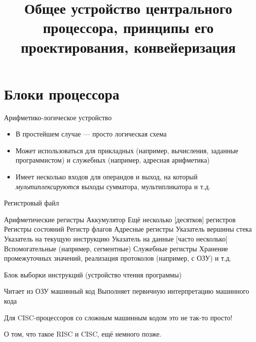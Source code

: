 \documentclass[xetex,aspectratio=43]{beamer}
\title[Устройство и принципы проектирования ЦП, конвейеризация]{Общее устройство центрального процессора, принципы его проектирования, конвейеризация}
\begin{document}
    \titleslide

    \tocslide

\section{Блоки процессора}

\begin{frame}{Арифметико-логическое устройство}
    \begin{itemize}
        \item В простейшем случае --- просто логическая схема
        \item Может использоваться для прикладных (например, вычисления, заданные программистом) и служебных (например, адресная арифметика)
        \item Имеет несколько входов для операндов и выход, на который \emph{мультиплексируются} выходы сумматора, мультипликатора и т.д.
    \end{itemize}
\end{frame}

\begin{frame}{Регистровый файл}
    \begin{outline}[itemize]
        \tightlist
        \1 Арифметические регистры
            \2 Аккумулятор
            \2 Ещё несколько [десятков] регистров
        \1 Регистры состояний
            \2 Регистр флагов
        \1 Адресные регистры
            \2 Указатель вершины стека
            \2 Указатель на текущую инструкцию
            \2 Указатель на данные [часто несколько]
            \2 Вспомогательные (например, сегментные)
        \1 Служебные регистры
            \2 Хранение промежуточных значений, реализация протоколов (например, с ОЗУ) и т.д.
    \end{outline}
\end{frame}

\begin{frame}{Блок выборки инструкций (устройство чтения программы)}
    \begin{outline}[itemize]
        \1 Читает из ОЗУ машинный код
            \2 Выполняет первичную интерпретацию машинного кода
    \end{outline}
    Для CISC-процессоров со сложным машинным кодом это не так-то просто!

    \pause
    \alert{О том, что такое RISC и CISC, ещё немного позже.}
\end{frame}
\end{document}
